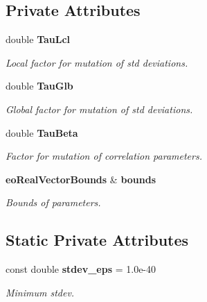 \subsection*{Private Attributes}
\begin{CompactItemize}
\item 
double {\bf Tau\-Lcl}\label{classeo_es_mutate_r0}

\begin{CompactList}\small\item\em Local factor for mutation of std deviations. \item\end{CompactList}\item 
double {\bf Tau\-Glb}\label{classeo_es_mutate_r1}

\begin{CompactList}\small\item\em Global factor for mutation of std deviations. \item\end{CompactList}\item 
double {\bf Tau\-Beta}\label{classeo_es_mutate_r2}

\begin{CompactList}\small\item\em Factor for mutation of correlation parameters. \item\end{CompactList}\item 
{\bf eo\-Real\-Vector\-Bounds} \& {\bf bounds}\label{classeo_es_mutate_r3}

\begin{CompactList}\small\item\em Bounds of parameters. \item\end{CompactList}\end{CompactItemize}
\subsection*{Static Private Attributes}
\begin{CompactItemize}
\item 
const double {\bf stdev\_\-eps} = 1.0e-40
\begin{CompactList}\small\item\em Minimum stdev. \item\end{CompactList}\end{CompactItemize}


